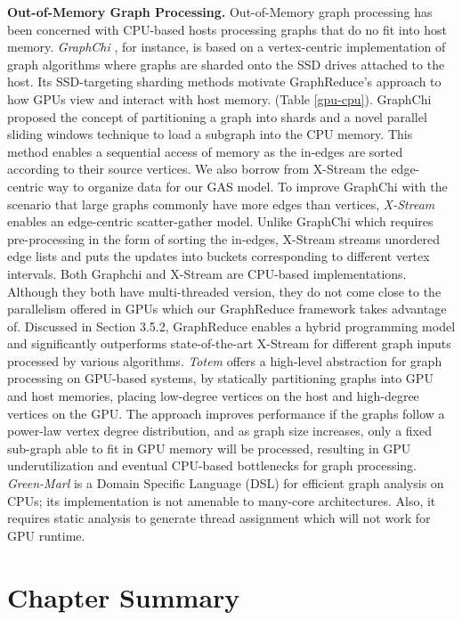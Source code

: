 {\bf Out-of-Memory Graph Processing.} Out-of-Memory graph processing has been concerned with CPU-based hosts processing graphs 
that do no fit into host memory. \textit{GraphChi} \cite{chi}, for instance, is based on a vertex-centric implementation of 
graph algorithms where graphs are sharded onto the SSD drives attached to the host. Its SSD-targeting sharding methods motivate 
GraphReduce's approach to how GPUs view and interact with host memory. (Table \ref{gpu-cpu}). 
GraphChi proposed the concept of partitioning a graph into shards and a novel parallel sliding windows technique to load a subgraph into the CPU memory. This method enables a sequential access of memory as the in-edges are sorted according to their source vertices.  
We also borrow from X-Stream \cite{xstream} the edge-centric way to organize data for our GAS model.
To improve GraphChi with the scenario that large graphs commonly have more edges than vertices, \textit{X-Stream} \cite{xstream} enables an edge-centric scatter-gather model. Unlike GraphChi which requires pre-processing in the form of sorting the in-edges, X-Stream streams unordered edge lists and puts the updates into buckets corresponding to different vertex intervals. Both Graphchi and X-Stream are CPU-based implementations. Although they both have multi-threaded version, they do not come close to the parallelism offered in GPUs which our GraphReduce framework takes advantage of. 
Discussed in Section 3.5.2, GraphReduce enables a hybrid programming model and significantly outperforms state-of-the-art X-Stream for different graph inputs processed by various algorithms. 
\textit{Totem} \cite{totem} offers a high-level abstraction for graph processing on GPU-based systems, by statically partitioning graphs 
into GPU and host memories, placing low-degree vertices on the host and high-degree vertices on the GPU. 
The approach improves performance if the graphs follow a power-law vertex degree distribution, and as graph size increases, only
a fixed sub-graph able to fit in GPU memory will be processed, resulting in GPU underutilization and eventual CPU-based bottlenecks
for graph processing. \textit{Green-Marl} \cite{green} is a Domain Specific Language (DSL) 
for efficient graph analysis on CPUs; its implementation is not amenable to many-core architectures. Also, it requires static analysis to generate thread assignment which will not work for GPU runtime. 
\fi

\section{Chapter Summary}


